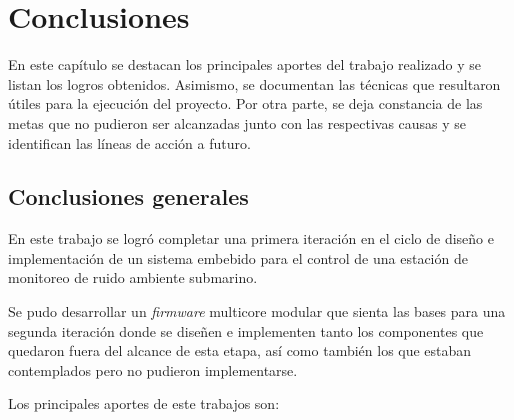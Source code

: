 
\chapter{Conclusiones} %

\label{Chapter5} %

En este capítulo se destacan los principales aportes del trabajo realizado y se listan los logros obtenidos.  Asimismo, se documentan las técnicas que resultaron  útiles para la ejecución del proyecto.  Por otra parte, se deja constancia de las metas que no pudieron ser alcanzadas junto con las respectivas causas y se identifican las líneas de acción a futuro.


\section{Conclusiones generales }


En este trabajo se logró completar una primera iteración en el ciclo de diseño e implementación de un sistema embebido para el control de una estación de monitoreo de ruido ambiente submarino.  

Se pudo desarrollar un \textit{firmware} multicore modular que sienta las bases para una segunda iteración donde se diseñen e implementen tanto los componentes que quedaron fuera del alcance de esta etapa, así como también los que estaban contemplados pero no pudieron implementarse.

Los principales aportes de este trabajos son:

